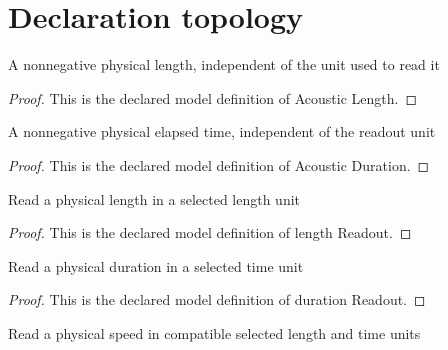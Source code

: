 \section{Declaration topology}
\begin{definition}
  \label{def:physics:phyx-mini-0321:phyxminiproblems-problemphyxmini0321-acousticlength}
  A nonnegative physical length, independent of the unit used to read it
\end{definition}
\begin{proof}
  This is the declared model definition of Acoustic Length.
\end{proof}
\begin{definition}
  \label{def:physics:phyx-mini-0321:phyxminiproblems-problemphyxmini0321-acousticduration}
  A nonnegative physical elapsed time, independent of the readout unit
\end{definition}
\begin{proof}
  This is the declared model definition of Acoustic Duration.
\end{proof}
\begin{definition}
  \label{def:physics:phyx-mini-0321:phyxminiproblems-problemphyxmini0321-lengthreadout}
  Read a physical length in a selected length unit
\end{definition}
\begin{proof}
  This is the declared model definition of length Readout.
\end{proof}
\begin{definition}
  \label{def:physics:phyx-mini-0321:phyxminiproblems-problemphyxmini0321-durationreadout}
  Read a physical duration in a selected time unit
\end{definition}
\begin{proof}
  This is the declared model definition of duration Readout.
\end{proof}
\begin{definition}
  \label{def:physics:phyx-mini-0321:phyxminiproblems-problemphyxmini0321-speedreadout}
  Read a physical speed in compatible selected length and time units
\end{definition}
